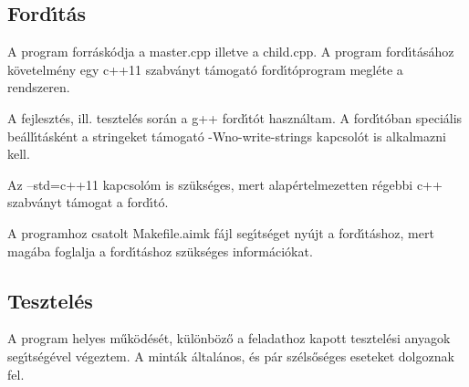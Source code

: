 \documentclass[10pt]{article}
\begin{document}
\subsection{Ford\'{\i}t\'{a}s}

{\normalsize
A program forr\'{a}sk\'{o}dja a master.cpp illetve a child.cpp. A program
ford\'{\i}t\'{a}s\'{a}hoz k\"{o}vetelm\'{e}ny egy c++11 szabv\'{a}nyt
t\'{a}mogat\'{o} ford\'{\i}t\'{o}program megl\'{e}te a rendszeren.

A fejleszt\'{e}s, ill. tesztel\'{e}s sor\'{a}n a g++ ford\'{\i}t\'{o}t
haszn\'{a}ltam. A ford\'{\i}t\'{o}ban speci\'{a}lis
be\'{a}ll\'{\i}t\'{a}sk\'{e}nt a stringeket t\'{a}mogat\'{o} -Wno-write-strings
kapcsol\'{o}t is alkalmazni kell.

Az --std=c++11 kapcsol\'{o}m is sz\"{u}ks\'{e}ges, mert alap\'{e}rtelmezetten
r\'{e}gebbi c++ szabv\'{a}nyt t\'{a}mogat a ford\'{\i}t\'{o}.

A programhoz csatolt Makefile.aimk f\'{a}jl seg\'{\i}ts\'{e}get ny\'{u}jt a
ford\'{\i}t\'{a}shoz, mert mag\'{a}ba foglalja a ford\'{\i}t\'{a}shoz
sz\"{u}ks\'{e}ges inform\'{a}ci\'{o}kat.
}
\newline
\newline
\subsection{Tesztel\'{e}s}

{\normalsize
{\raggedright
A program helyes m\H{u}k\"{o}d\'{e}s\'{e}t, k\"{u}l\"{o}nb\"{o}z\H{o} a
feladathoz kapott tesztel\'{e}si anyagok seg\'{\i}ts\'{e}g\'{e}vel v\'{e}geztem.
A mint\'{a}k \'{a}ltal\'{a}nos, \'{e}s p\'{a}r sz\'{e}ls\H{o}s\'{e}ges eseteket
dolgoznak fel.
}
}
\newline
\newline
\end{document}
